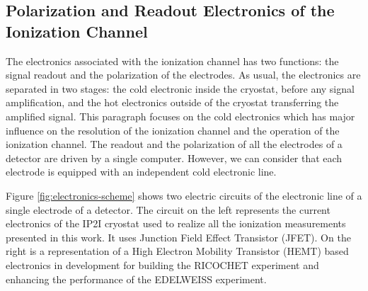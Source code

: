 

\subsection{Polarization and Readout Electronics of the Ionization Channel}
\label{par:electronics-ionization}


The electronics associated with the ionization channel has two functions: the signal readout and the polarization of the electrodes. As usual, the electronics are separated in two stages: the cold electronic inside the cryostat, before any signal amplification, and the hot electronics outside of the cryostat transferring the amplified signal. This paragraph focuses on the cold electronics which has major influence on the resolution of the ionization channel and the operation of the ionization channel. The readout and the polarization of all the electrodes of a detector are driven by a single computer. However, we can  consider that each electrode is equipped with an independent cold electronic line.

Figure \ref{fig:electronics-scheme} shows two electric circuits of the electronic line of a single electrode of a detector. The circuit on the left represents the current electronics of the IP2I cryostat used to realize all the ionization measurements presented in this work. It uses Junction Field Effect Transistor (JFET). On the right is a representation of a High Electron Mobility Transistor (HEMT) based electronics in development for building the RICOCHET experiment and enhancing the performance of the EDELWEISS experiment.

